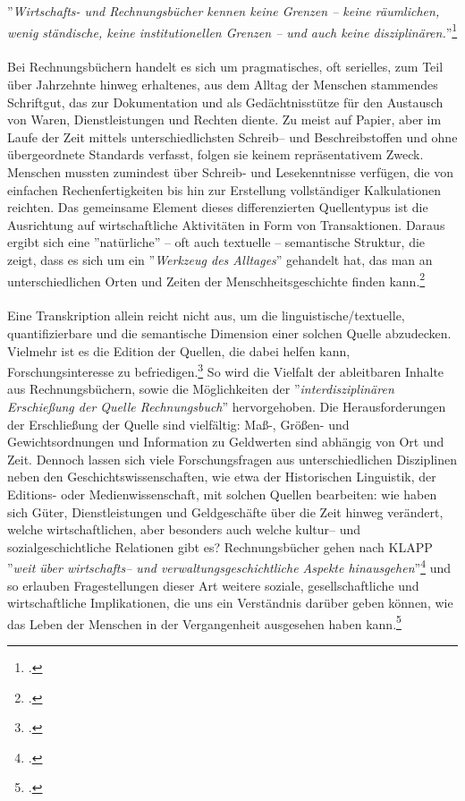 \documentclass[12pt,a4paper]{article}
\begin{document}
''\textit{Wirtschafts- und Rechnungsbücher kennen keine Grenzen -- keine räumlichen, wenig ständische, keine institutionellen Grenzen -- und auch keine disziplinären.}''\footcite[][S.51]{gleba2016rechnen}
\\
\\
Bei Rechnungsbüchern handelt es sich um pragmatisches, oft serielles, zum Teil über Jahrzehnte hinweg erhaltenes, aus dem Alltag der Menschen stammendes Schriftgut, das zur Dokumentation und als Gedächtnisstütze für den Austausch von Waren, Dienstleistungen und Rechten diente. Zu meist auf Papier, aber im Laufe der Zeit mittels unterschiedlichsten Schreib-- und Beschreibstoffen und ohne übergeordnete Standards verfasst, folgen sie keinem repräsentativem Zweck. Menschen mussten zumindest über Schreib- und Lesekenntnisse verfügen, die von einfachen Rechenfertigkeiten bis hin zur Erstellung vollständiger Kalkulationen reichten. Das gemeinsame Element dieses differenzierten Quellentypus ist die Ausrichtung auf wirtschaftliche Aktivitäten in Form von Transaktionen. Daraus ergibt sich eine ''natürliche'' -- oft auch textuelle -- semantische Struktur, die zeigt, dass es sich um ein ''\textit{Werkzeug des Alltages}'' gehandelt hat, das man an unterschiedlichen Orten und Zeiten der Menschheitsgeschichte finden kann.\footcite[Eine Übersicht zu historischen Rechnungsbücher und Handelspraktiken findet sich auch bei:][]{denzel2002kaufmannsbucher}
\\
\\
Eine Transkription allein reicht nicht aus, um die linguistische/textuelle, quantifizierbare und die semantische Dimension einer solchen Quelle abzudecken. Vielmehr ist es die Edition der Quellen, die dabei helfen kann, Forschungsinteresse zu befriedigen.\footcite{vogeler2015mittelalterliche} So wird die Vielfalt der ableitbaren Inhalte aus Rechnungsbüchern, sowie die Möglichkeiten der ''\textit{interdisziplinären Erschießung der Quelle Rechnungsbuch}'' hervorgehoben. Die Herausforderungen der Erschließung der Quelle sind vielfältig: Maß-, Größen- und Gewichtsordnungen und Information zu Geldwerten sind abhängig von Ort und Zeit. Dennoch lassen sich viele Forschungsfragen aus unterschiedlichen Disziplinen neben den Geschichtswissenschaften, wie etwa der Historischen Linguistik, der Editions- oder Medienwissenschaft, mit solchen Quellen bearbeiten: wie haben sich Güter, Dienstleistungen und Geldgeschäfte über die Zeit hinweg verändert, welche wirtschaftlichen, aber besonders auch welche kultur-- und sozialgeschichtliche Relationen gibt es? Rechnungsbücher gehen nach KLAPP ''\textit{weit über wirtschafts-- und verwaltungsgeschichtliche
Aspekte hinausgehen}''\footcite[][S.14]{klapp2011rechnung} und so erlauben Fragestellungen dieser Art weitere soziale, gesellschaftliche und wirtschaftliche Implikationen, die uns ein Verständnis darüber geben können, wie das Leben der Menschen in der Vergangenheit ausgesehen haben kann.\footcite[][S.7-10]{gleba2015einleitung}
\end{document}
